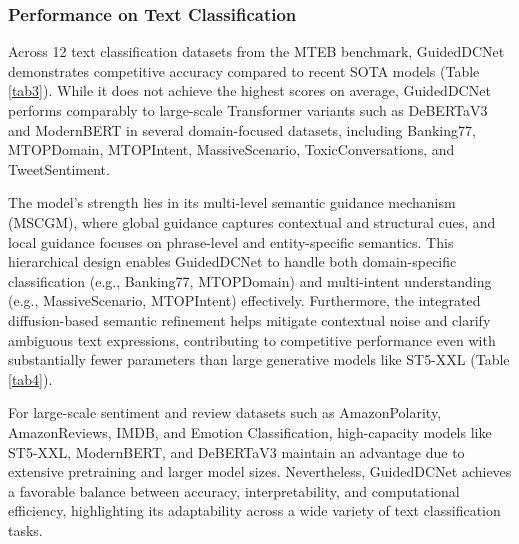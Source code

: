 \documentclass[a4paper,fleqn]{cas-sc}
\begin{document}
\subsubsection{Performance on Text Classification}

Across 12 text classification datasets from the MTEB benchmark, GuidedDCNet demonstrates competitive accuracy compared to recent SOTA models (Table \ref{tab3}). While it does not achieve the highest scores on average, GuidedDCNet performs comparably to large-scale Transformer variants such as DeBERTaV3 and ModernBERT in several domain-focused datasets, including Banking77, MTOPDomain, MTOPIntent, MassiveScenario, ToxicConversations, and TweetSentiment.

The model’s strength lies in its multi-level semantic guidance mechanism (MSCGM), where global guidance captures contextual and structural cues, and local guidance focuses on phrase-level and entity-specific semantics. This hierarchical design enables GuidedDCNet to handle both domain-specific classification (e.g., Banking77, MTOPDomain) and multi-intent understanding (e.g., MassiveScenario, MTOPIntent) effectively. Furthermore, the integrated diffusion-based semantic refinement helps mitigate contextual noise and clarify ambiguous text expressions, contributing to competitive performance even with substantially fewer parameters than large generative models like ST5-XXL (Table \ref{tab4}).

For large-scale sentiment and review datasets such as AmazonPolarity, AmazonReviews, IMDB, and Emotion Classification, high-capacity models like ST5-XXL, ModernBERT, and DeBERTaV3 maintain an advantage due to extensive pretraining and larger model sizes. Nevertheless, GuidedDCNet achieves a favorable balance between accuracy, interpretability, and computational efficiency, highlighting its adaptability across a wide variety of text classification tasks.
\end{document}
